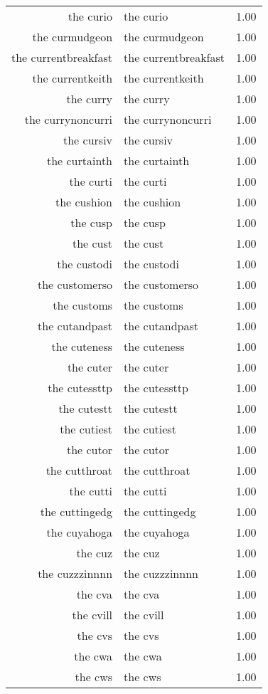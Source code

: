 \begin{table}[ht]
\begin{tabular}{rlr}
  the curio & the curio & 1.00 \\ 
  the curmudgeon & the curmudgeon & 1.00 \\ 
  the currentbreakfast & the currentbreakfast & 1.00 \\ 
  the currentkeith & the currentkeith & 1.00 \\ 
  the curry & the curry & 1.00 \\ 
  the currynoncurri & the currynoncurri & 1.00 \\ 
  the cursiv & the cursiv & 1.00 \\ 
  the curtainth & the curtainth & 1.00 \\ 
  the curti & the curti & 1.00 \\ 
  the cushion & the cushion & 1.00 \\ 
  the cusp & the cusp & 1.00 \\ 
  the cust & the cust & 1.00 \\ 
  the custodi & the custodi & 1.00 \\ 
  the customerso & the customerso & 1.00 \\ 
  the customs & the customs & 1.00 \\ 
  the cutandpast & the cutandpast & 1.00 \\ 
  the cuteness & the cuteness & 1.00 \\ 
  the cuter & the cuter & 1.00 \\ 
  the cutessttp & the cutessttp & 1.00 \\ 
  the cutestt & the cutestt & 1.00 \\ 
  the cutiest & the cutiest & 1.00 \\ 
  the cutor & the cutor & 1.00 \\ 
  the cutthroat & the cutthroat & 1.00 \\ 
  the cutti & the cutti & 1.00 \\ 
  the cuttingedg & the cuttingedg & 1.00 \\ 
  the cuyahoga & the cuyahoga & 1.00 \\ 
  the cuz & the cuz & 1.00 \\ 
  the cuzzzinnnn & the cuzzzinnnn & 1.00 \\ 
  the cva & the cva & 1.00 \\ 
  the cvill & the cvill & 1.00 \\ 
  the cvs & the cvs & 1.00 \\ 
  the cwa & the cwa & 1.00 \\ 
  the cws & the cws & 1.00 \\ 

\end{tabular}
\end{table}
